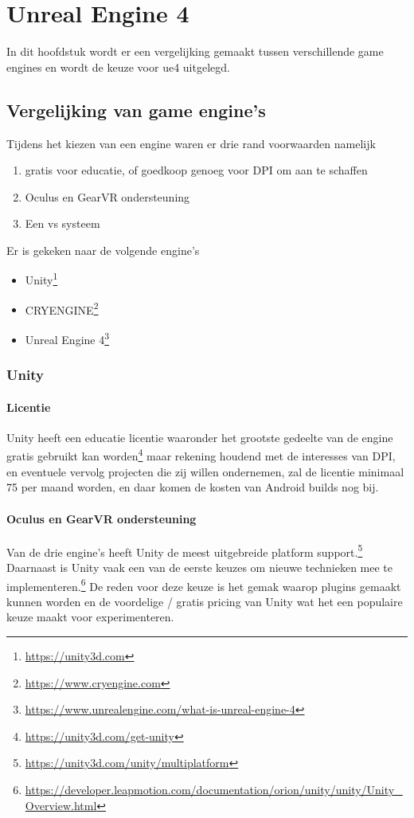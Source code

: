 \chapter{Unreal Engine 4}

In dit hoofdstuk wordt er een vergelijking gemaakt tussen verschillende game engines en wordt de keuze voor \gls{ue4} uitgelegd.

\section{Vergelijking van game engine's}

Tijdens het kiezen van een engine waren er drie rand voorwaarden namelijk 
\begin{enumerate}
	\item gratis voor educatie, of goedkoop genoeg voor DPI om aan te schaffen
	\item Oculus en GearVR ondersteuning
	\item Een \gls{vs} systeem
\end{enumerate}

Er is gekeken naar de volgende engine's 
\begin{itemize}
\item Unity\footnote{\url{https://unity3d.com}}
\item CRYENGINE\footnote{\url{https://www.cryengine.com}}
\item Unreal Engine 4\footnote{\url{https://www.unrealengine.com/what-is-unreal-engine-4}}
\end{itemize}

\subsection{Unity}

\subsubsection{Licentie}
Unity heeft een educatie licentie waaronder het grootste gedeelte van de engine gratis gebruikt kan worden\footnote{\url{https://unity3d.com/get-unity}} maar rekening houdend met de interesses van DPI, en eventuele vervolg projecten die zij willen ondernemen, zal de licentie minimaal 75 per maand worden, en daar komen de kosten van Android builds nog bij.

\subsubsection{Oculus en GearVR ondersteuning}
Van de drie engine’s heeft Unity de meest uitgebreide platform support.\footnote{\url{https://unity3d.com/unity/multiplatform}} Daarnaast is Unity vaak een van de eerste keuzes om nieuwe technieken mee te implementeren.\footnote{\url{https://developer.leapmotion.com/documentation/orion/unity/unity/Unity_Overview.html}} De reden voor deze keuze is het gemak waarop plugins gemaakt kunnen worden en de voordelige / gratis pricing van Unity wat het een populaire keuze maakt voor experimenteren.

